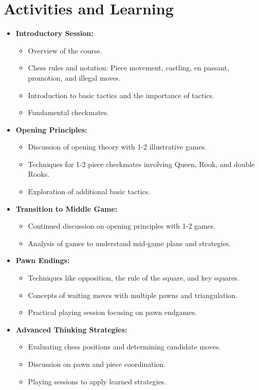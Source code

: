 \documentclass[a4paper,11pt]{article}
\begin{document}
\section{Activities and Learning}
\begin{itemize}
    \item \textbf{Introductory Session:}
    \begin{itemize}
        \item Overview of the course.
        \item Chess rules and notation: Piece movement, castling, en passant, promotion, and illegal moves.
        \item Introduction to basic tactics and the importance of tactics.
        \item Fundamental checkmates.
    \end{itemize}

    \item \textbf{Opening Principles:}
    \begin{itemize}
        \item Discussion of opening theory with 1-2 illustrative games.
        \item Techniques for 1-2 piece checkmates involving Queen, Rook, and double Rooks.
        \item Exploration of additional basic tactics.
    \end{itemize}

    \item \textbf{Transition to Middle Game:}
    \begin{itemize}
        \item Continued discussion on opening principles with 1-2 games.
        \item Analysis of games to understand mid-game plans and strategies.
    \end{itemize}

    \item \textbf{Pawn Endings:}
    \begin{itemize}
        \item Techniques like opposition, the rule of the square, and key squares.
        \item Concepts of waiting moves with multiple pawns and triangulation.
        \item Practical playing session focusing on pawn endgames.
    \end{itemize}

    \item \textbf{Advanced Thinking Strategies:}
    \begin{itemize}
        \item Evaluating chess positions and determining candidate moves.
        \item Discussion on pawn and piece coordination.
        \item Playing sessions to apply learned strategies.
    \end{itemize}


\end{itemize}
\end{document}
